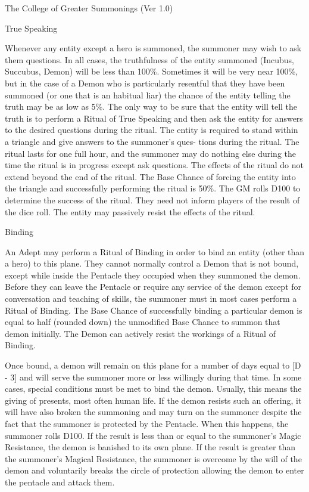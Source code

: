\begin{Chapter}{The College of Greater Summonings (Ver 1.0)}
\begin{ritual}[Q-5]{True Speaking}
\begin{effects}
Whenever any entity except a hero is summoned, the summoner may wish
to ask them questions.  In all cases, the truthfulness of the entity
summoned (Incubus, Succubus, Demon) will be less than 100\%.
Sometimes it will be very near 100\%, but in the case of a Demon who
is particularly resentful that they have been summoned (or one that is
an habitual liar) the chance of the entity telling the truth may be as
low as 5\%.  The only way to be sure that the entity will tell the
truth is to perform a Ritual of True Speaking and then ask the entity
for answers to the desired questions during the ritual.  The entity is
required to stand within a triangle and give answers to the summoner’s
ques- tions during the ritual.  The ritual lasts for one full hour,
and the summoner may do nothing else during the time the ritual is in
progress except ask questions.  The effects of the ritual do not
extend beyond the end of the ritual.  The Base Chance of forcing the
entity into the triangle and successfully performing the ritual is
50\%.  The GM rolls D100 to determine the success of the ritual.  They
need not inform players of the result of the dice roll. The entity may
passively resist the effects of the ritual.
\end{effects}
\end{ritual}

\begin{ritual}[Q-6]{Binding}

\begin{effects}
An Adept may perform a Ritual of Binding in order to bind an entity
(other than a hero) to this plane. They cannot normally control a
Demon that is not bound, except while inside the Pentacle they
occupied when they summoned the demon. Before they can leave the
Pentacle or require any service of the demon except for conversation
and teaching of skills, the summoner must in most cases perform a
Ritual of Binding.  The Base Chance of successfully binding a
particular demon is equal to half (rounded down) the unmodified Base
Chance to summon that demon initially.  The Demon can actively resist
the workings of a Ritual of Binding.

Once bound, a demon will remain on this plane for a number of days
equal to [D - 3] and will serve the summoner more or less willingly
during that time.  In some cases, special conditions must be met to
bind the demon.  Usually, this means the giving of presents, most
often human life.  If the demon resists such an offering, it will have
also broken the summoning and may turn on the summoner despite the
fact that the summoner is protected by the Pentacle.  When this
happens, the summoner rolls D100. If the result is less than or equal
to the summoner’s Magic Resistance, the demon is banished to its own
plane.  If the result is greater than the summoner’s Magical
Resistance, the summoner is overcome by the will of the demon and
voluntarily breaks the circle of protection allowing the demon to
enter the pentacle and attack them.


\end{effects}
\end{ritual}
\end{Chapter}
